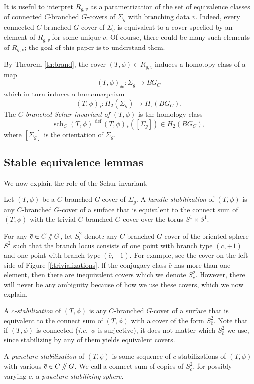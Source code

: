 \documentclass[10pt,twocolumn,amsmath,amssymb,aps,pra,secnumarabic,
    nofootinbib,groupedaddress]{revtex4-1}
\newcommand{\ie}{\emph{i.e.~}}
\newcommand{\defeq}{\stackrel{\mathrm{def}}=}
\newcommand{\sslash}{\mathbin{/\mkern-5mu/}}
\newcommand{\sch}{\operatorname{sch}}
\begin{document}
It is useful to interpret $R_{g,v}$ as a parametrization of the set of equivalence classes of connected $C$-branched $G$-covers of $\Sigma_g$ with branching data $v$.  Indeed, every connected $C$-branched $G$-cover of $\Sigma_g$ is equivalent to a cover specfied by an element of $R_{g,v}$ for some unique $v$.  Of course, there could be many such elements of $R_{g,v}$; the goal of this paper is to understand them.

By Theorem \ref{th:brand}, the cover $(T,\phi) \in R_{g,v}$ induces a homotopy class of a map
\[ (T,\phi)_\#: \Sigma_g \to BG_C \]
which in turn induces a homomorphism
\[ (T,\phi)_*: H_2(\Sigma_g) \to H_2(BG_C). \]
The \emph{$C$-branched Schur invariant of $(T,\phi)$} is the homology class
\[ \sch_C(T,\phi) \defeq (T,\phi)_*\left([\Sigma_g]\right) \in H_2(BG_C), \]
where $[\Sigma_g]$ is the orientation of $\Sigma_g$.

\subsection{Stable equivalence lemmas}
\label{ss:stable}
We now explain the role of the Schur invariant.

Let $(T,\phi)$ be a $C$-branched $G$-cover of $\Sigma_g$.  A \emph{handle stabilization} of $(T,\phi)$ is any $C$-branched $G$-cover of a surface that is equivalent to the connect sum of $(T,\phi)$ with the trivial $C$-branched $G$-cover over the torus $S^1 \times S^1$.

For any $\overline{c} \in C\sslash G$, let $S^2_{\overline{c}}$ denote any $C$-branched $G$-cover of the oriented sphere $S^2$ such that the branch locus consists of one point with branch type $(\overline{c},+1)$ and one point with branch type $(\overline{c},-1)$.  For example, see the cover on the left side of Figure \ref{f:trivializations}.  If the conjugacy class $\overline{c}$ has more than one element, then there are inequivalent covers which we denote $S^2_{\overline{c}}$.  However, there will never be any ambiguity because of how we use these covers, which we now explain.

A \emph{$\overline{c}$-stabilization} of $(T,\phi)$ is any $C$-branched $G$-cover of a surface that is equivalent to the connect sum of $(T,\phi)$ with a cover of the form $S^2_{\overline{c}}$.  Note that if $(T,\phi)$ is connected (\ie $\phi$ is surjective), it does not matter which $S^2_{\overline{c}}$ we use, since stabilizing by any of them yields equivalent covers.

A \emph{puncture stabilization} of $(T,\phi)$ is some sequence of $\overline{c}$-stabilizations of $(T,\phi)$ with various $\overline{c} \in C\sslash G$.  We call a connect sum of copies of $S^2_{\overline{c}}$, for possibly varying $c$, a \emph{puncture stabilizing sphere}.
\end{document}
